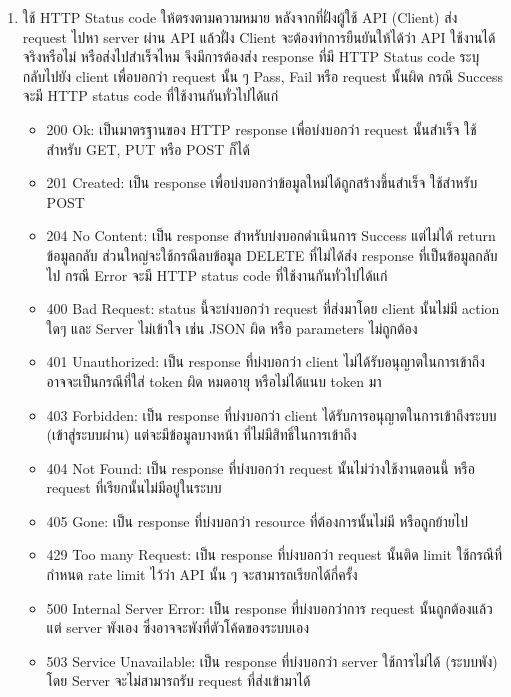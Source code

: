\documentclass[14pt,oneside,openright,a4paper]{cpe-thai-project}
\begin{document}
\begin{enumerate}
        \item ใช้ HTTP Status code ให้ตรงตามความหมาย
              หลังจากที่ฝั่งผู้ใช้ API (Client) ส่ง request ไปหา server ผ่าน API แล้วฝั่ง Client จะต้องทำการยืนยันให้ได้ว่า API ใช้งานได้จริงหรือไม่ หรือส่งไปสำเร็จไหม จึงมีการต้องส่ง response ที่มี HTTP Status code ระบุ กลับไปยัง client เพื่อบอกว่า request นั้น ๆ Pass, Fail หรือ request นั้นผิด
              กรณี Success จะมี HTTP status code ที่ใช้งานกันทั่วไปได้แก่ 
          \begin{itemize}
            \item 200 Ok: เป็นมาตรฐานของ HTTP response เพื่อบ่งบอกว่า request นั้นสำเร็จ ใช้สำหรับ GET, PUT หรือ POST ก็ได้
            \item 201 Created: เป็น response เพื่อบ่งบอกว่าข้อมูลใหม่ได้ถูกสร้างขึ้นสำเร็จ ใช้สำหรับ POST
            \item 204 No Content: เป็น response สำหรับบ่งบอกดำเนินการ Success แต่ไม่ได้ return ข้อมูลกลับ ส่วนใหญ่จะใช้กรณีลบข้อมูล DELETE ที่ไม่ได้ส่ง response ที่เป็นข้อมูลกลับไป
                  กรณี Error จะมี HTTP status code ที่ใช้งานกันทั่วไปได้แก่
            \item 400 Bad Request: status นี้จะบ่งบอกว่า request ที่ส่งมาโดย client นั้นไม่มี action ใดๆ และ Server ไม่เข้าใจ เช่น JSON ผิด หรือ parameters ไม่ถูกต้อง
            \item 401 Unauthorized: เป็น response ที่บ่งบอกว่า client ไม่ได้รับอนุญาตในการเข้าถึง อาจจะเป็นกรณีที่ใส่ token ผิด หมดอายุ หรือไม่ได้แนบ token มา
            \item 403 Forbidden: เป็น response ที่บ่งบอกว่า client ได้รับการอนุญาตในการเข้าถึงระบบ (เข้าสู่ระบบผ่าน) แต่จะมีข้อมูลบางหน้า ที่ไม่มีสิทธิ์ในการเข้าถึง
            \item 404 Not Found: เป็น response ที่บ่งบอกว่า request นั้นไม่ว่างใช้งานตอนนี้ หรือ request ที่เรียกนั้นไม่มีอยู่ในระบบ
            \item 405 Gone: เป็น response ที่บ่งบอกว่า resource ที่ต้องการนั้นไม่มี หรือถูกย้ายไป
            \item 429 Too many Request: เป็น response ที่บ่งบอกว่า request นั้นติด limit ใช้กรณีที่กำหนด rate limit ไว้ว่า API นั้น ๆ จะสามารถเรียกได้กี่ครั้ง
            \item 500 Internal Server Error: เป็น response ที่บ่งบอกว่าการ request นั้นถูกต้องแล้ว แต่ server พังเอง ซึ่งอาจจะพังที่ตัวโค้ดของระบบเอง
            \item 503 Service Unavailable: เป็น response ที่บ่งบอกว่า server ใช้การไม่ได้ (ระบบพัง) โดย Server จะไม่สามารถรับ request ที่ส่งเข้ามาได้

\end{itemize}
\end{enumerate}
\end{document}
